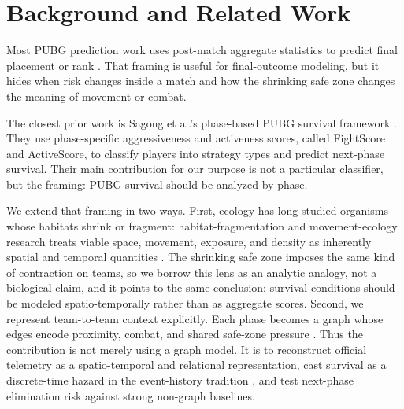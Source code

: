 \section{Background and Related Work}
\label{sec:related-work}

Most PUBG prediction work uses post-match aggregate statistics to predict final
placement or rank \cite{kagglePubgFinishPlacement,sen2021pubgFinalRank,lee2025pubgRank}.
That framing is useful for final-outcome modeling, but it hides when risk
changes inside a match and how the shrinking safe zone changes the meaning of
movement or combat.

The closest prior work is Sagong et al.'s phase-based PUBG survival framework
\cite{sagong2025hunterCamper}. They use phase-specific aggressiveness and
activeness scores, called FightScore and ActiveScore, to classify players into
strategy types and predict next-phase survival. Their main contribution for our
purpose is not a particular classifier, but the framing: PUBG survival should
be analyzed by phase.

We extend that framing in two ways. First, ecology has long studied organisms
whose habitats shrink or fragment: habitat-fragmentation and movement-ecology
research treats viable space, movement, exposure, and density as inherently
spatial and temporal quantities
\cite{fahrig2003fragmentation,nathan2008movement}. The shrinking safe zone
imposes the same kind of contraction on teams, so we borrow this lens as an
analytic analogy, not a biological claim, and it points to the same
conclusion: survival conditions should be modeled spatio-temporally rather
than as aggregate scores. Second, we represent
team-to-team context explicitly. Each phase becomes a graph whose edges encode
proximity, combat, and shared safe-zone pressure
\cite{sanchezLengeling2021gnnIntro}. Thus the contribution is not merely using
a graph model. It is to reconstruct official telemetry as a spatio-temporal and
relational representation, cast survival as a discrete-time hazard in the
event-history tradition \cite{allison1982discrete,singer1993discrete}, and
test next-phase elimination risk against strong non-graph baselines.
